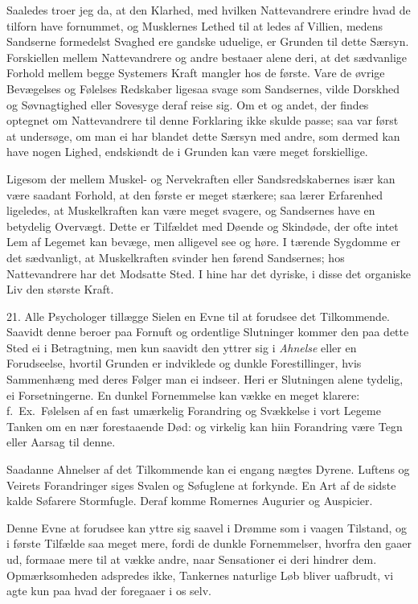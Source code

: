 \documentclass[12pt,a4paper]{article}
\newcommand{\opage}[1]{\marginnote{\footnotesize\textit{[#1]}}}
\begin{document}
Saaledes troer jeg da, at den Klarhed, med hvilken Nattevandrere erindre hvad de tilforn
have fornummet, og Musklernes Lethed til at ledes af Villien, medens Sandserne formedelst
Svaghed ere gandske uduelige, er Grunden til dette Særsyn. Forskiellen mellem
Nattevandrere og andre bestaaer alene deri, at det sædvanlige Forhold mellem begge
Systemers Kraft mangler hos de første. Vare de øvrige Bevægelses og Følelses Redskaber
ligesaa svage som Sandsernes, vilde Dorskhed og Søvnagtighed eller Sovesyge deraf reise
sig. Om et og andet, der findes optegnet om Nattevandrere til denne Forklaring ikke
skulde passe; saa var først at undersøge, om man ei har blandet dette Særsyn med andre,
som dermed kan have nogen Lighed, endskiøndt de i Grunden kan være meget forskiellige.

\opage{133} Ligesom der mellem Muskel- og Nervekraften eller Sandsredskabernes især kan være saadant
Forhold, at den første er meget stærkere; saa lærer Erfarenhed ligeledes, at
Muskelkraften kan være meget svagere, og Sandsernes have en betydelig Overvægt. Dette er
Tilfældet med Døende og Skindøde, der ofte intet Lem af Legemet kan bevæge, men alligevel
see og høre. I tærende Sygdomme er det sædvanligt, at Muskelkraften svinder hen førend
Sandsernes; hos Nattevandrere har det Modsatte Sted. I hine har det dyriske, i disse det
organiske Liv den største Kraft.

21. Alle Psychologer tillægge Sielen en Evne til at forudsee det Tilkommende. Saavidt
denne beroer paa Fornuft og ordentlige Slutninger kommer den paa dette Sted ei i
Betragtning, men kun saavidt den yttrer sig i \emph{Ahnelse} eller en Forudseelse,
hvortil Grunden er indviklede og dunkle Forestillinger, hvis Sammenhæng med deres Følger
man ei indseer. Heri er Slutningen alene tydelig, ei Forsetningerne. En dunkel
Fornemmelse kan vække en meget klarere: f.~Ex.\ Følelsen af en fast umærkelig Forandring
og Svækkelse i vort Legeme Tanken om en nær forestaaende Død: og virkelig kan hiin
Forandring være Tegn eller Aarsag til denne.

Saadanne Ahnelser af det Tilkommende kan ei engang nægtes Dyrene. Luftens og Veirets
Forandringer siges Svalen og Søfuglene at forkynde. En Art af de
\opage{134} sidste kalde Søfarere Stormfugle. Deraf komme Romernes Augurier og Auspicier.

Denne Evne at forudsee kan yttre sig saavel i Drømme som i vaagen Tilstand, og i første
Tilfælde saa meget mere, fordi de dunkle Fornemmelser, hvorfra den gaaer ud, formaae mere
til at vække andre, naar Sensationer ei deri hindrer dem. Opmærksomheden adspredes ikke,
Tankernes naturlige Løb bliver uafbrudt, vi agte kun paa hvad der foregaaer i os selv.
\end{document}
